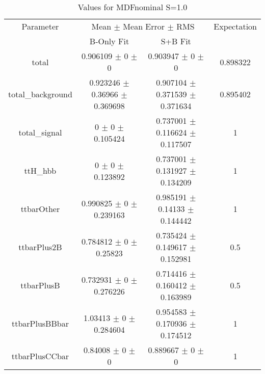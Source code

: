 \begin{table}
\centering
\caption{Values for MDFnominal S=1.0}
\begin{tabular}{cccc}
\toprule
Parameter & \multicolumn{2}{c}{Mean $\pm$ Mean Error $\pm$ RMS} & Expectation\\
 & B-Only Fit & S+B Fit & \\
\midrule
total & \num{0.906109} $\pm$ \num{0} $\pm$ \num{0} & \num{0.903947} $\pm$ \num{0} $\pm$ \num{0} & \num{0.898322}\\
total\_background & \num{0.923246} $\pm$ \num{0.36966} $\pm$ \num{0.369698} & \num{0.907104} $\pm$ \num{0.371539} $\pm$ \num{0.371634} & \num{0.895402}\\
total\_signal & \num{0} $\pm$ \num{0} $\pm$ \num{0.105424} & \num{0.737001} $\pm$ \num{0.116624} $\pm$ \num{0.117507} & \num{1}\\
ttH\_hbb & \num{0} $\pm$ \num{0} $\pm$ \num{0.123892} & \num{0.737001} $\pm$ \num{0.131927} $\pm$ \num{0.134209} & \num{1}\\
ttbarOther & \num{0.990825} $\pm$ \num{0} $\pm$ \num{0.239163} & \num{0.985191} $\pm$ \num{0.14133} $\pm$ \num{0.144442} & \num{1}\\
ttbarPlus2B & \num{0.784812} $\pm$ \num{0} $\pm$ \num{0.25823} & \num{0.735424} $\pm$ \num{0.149617} $\pm$ \num{0.152981} & \num{0.5}\\
ttbarPlusB & \num{0.732931} $\pm$ \num{0} $\pm$ \num{0.276226} & \num{0.714416} $\pm$ \num{0.160412} $\pm$ \num{0.163989} & \num{0.5}\\
ttbarPlusBBbar & \num{1.03413} $\pm$ \num{0} $\pm$ \num{0.284604} & \num{0.954583} $\pm$ \num{0.170936} $\pm$ \num{0.174512} & \num{1}\\
ttbarPlusCCbar & \num{0.84008} $\pm$ \num{0} $\pm$ \num{0} & \num{0.889667} $\pm$ \num{0} $\pm$ \num{0} & \num{1}\\
\bottomrule
\end{tabular}
\end{table}